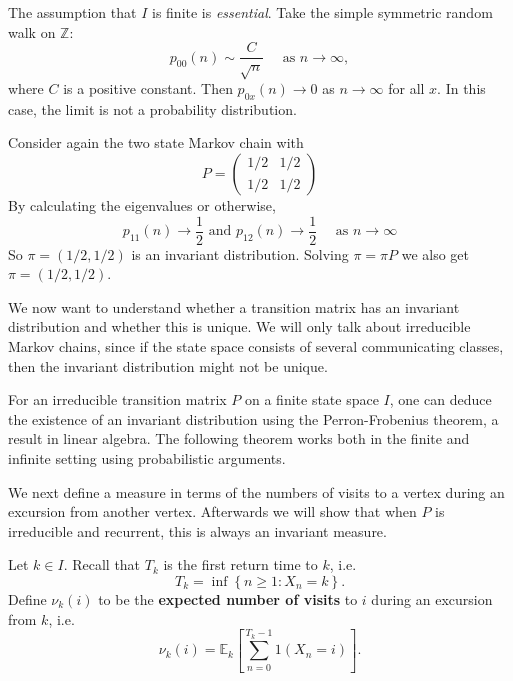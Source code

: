 \documentclass[a4paper,11pt]{article}
\begin{document}
\begin{remark}
    The assumption that $I$ is finite is \textit{essential}. Take the simple symmetric random walk on $\mathbb{Z}$:
    \[
    p_{00}(n) \sim \frac{C}{\sqrt{n}} \quad \text { as } n \rightarrow \infty,
    \]
    where $C$ is a positive constant. Then $p_{0 x}(n) \rightarrow 0$ as $n \rightarrow \infty$ for all $x$. In this case, the limit is not a probability distribution.
\end{remark}

\begin{example}
    Consider again the two state Markov chain with
    \[
    P=
    \begin{pmatrix}
        1 / 2 & 1 / 2 \\
    1 / 2 & 1 / 2
    \end{pmatrix}
    \]
    By calculating the eigenvalues or otherwise,
    \[
    p_{11}(n) \rightarrow \frac{1}{2} \text { and } p_{12}(n) \rightarrow \frac{1}{2} \quad \text { as } n \rightarrow \infty
    \]
    So $\pi=(1 / 2,1 / 2)$ is an invariant distribution. Solving $\pi=\pi P$ we also get $\pi=(1 / 2,1 / 2)$.
\end{example}

We now want to understand whether a transition matrix has an invariant distribution and whether this is unique. We will only talk about irreducible Markov chains, since if the state space consists of several communicating classes, then the invariant distribution might not be unique.

\begin{remark}
    For an irreducible transition matrix $P$ on a finite state space $I$, one can deduce the existence of an invariant distribution using the Perron-Frobenius theorem, a result in linear algebra. The following theorem works both in the finite and infinite setting using probabilistic arguments.
\end{remark}

We next define a measure in terms of the numbers of visits to a vertex during an excursion from another vertex. Afterwards we will show that when $P$ is irreducible and recurrent, this is always an invariant measure.

\begin{definition}
    Let $k \in I$. Recall that $T_k$ is the first return time to $k$, i.e.
    \[
    T_k=\inf \left\{n \geq 1: X_n=k\right\} .
    \]
    Define $\nu_k(i)$ to be the \textbf{expected number of visits} to $i$ during an excursion from $k$, i.e.
    \[
    \nu_k(i)=\mathbb{E}_k\left[\sum_{n=0}^{T_k-1} 1\left(X_n=i\right)\right] .
    \]
\end{definition}
\end{document}
